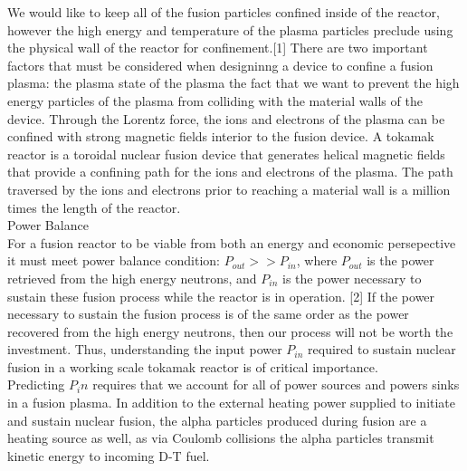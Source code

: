 \documentclass{article}
\begin{document}
We would like to keep all of the fusion particles confined inside of the reactor, however the high energy and temperature of the plasma particles preclude using the physical wall of the reactor for confinement.[1] There are two important factors that must be considered when designinng a device to confine a fusion plasma: the plasma state of the plasma the fact that we want to prevent the high energy particles of the plasma from colliding with the material walls of the device. Through the Lorentz force, the ions and electrons of the plasma can be confined with strong magnetic fields interior to the fusion device. A tokamak reactor is a toroidal nuclear fusion device that generates helical magnetic fields that provide a confining path for the ions and electrons of the plasma. The path traversed by the ions and electrons prior to reaching a material wall is a million times the length of the reactor.\\
\newline
Power Balance\\
For a fusion reactor to be viable from both an energy and economic persepective it must meet power balance condition: $P_{out} >> P_{in}$, where $P_{out}$ is the power retrieved from the high energy neutrons, and $P_{in}$ is the power necessary to sustain these fusion process while the reactor is in operation. [2] If the power necessary to sustain the fusion process is of the same order as the power recovered from the high energy neutrons, then our process will not be worth the investment. Thus, understanding the input power $P_{in}$ required to sustain nuclear fusion in a working scale tokamak reactor is of critical importance.\\
Predicting $P_in$ requires that we account for all of  power sources and powers sinks in a fusion plasma.   In addition to the external heating power supplied to initiate and sustain nuclear fusion, the alpha particles produced during fusion are a heating source as well, as via Coulomb collisions the alpha particles transmit kinetic energy to incoming D-T fuel.
\end{document}
